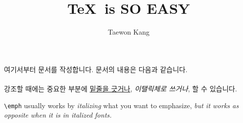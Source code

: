 \documentclass{oblivoir}
\author{Taewon Kang}
\title{{\TeX \ is SO EASY}}
\begin{document}
	\maketitle
	여기서부터 문서를 작성합니다. 문서의 내용은 다음과 같습니다.\\ \\
	강조할 때에는 중요한 부분에 \underline{밑줄을 긋거나}, \emph{이탤릭체로 쓰거나},  할 수 있습니다.
	
	\vspace{10pt}
	\verb|\emph| usually works by \emph{italizing} what you want to emphasize,
	\textit{but it works as opposite when it is in \emph{italized} fonts.}
\end{document}
